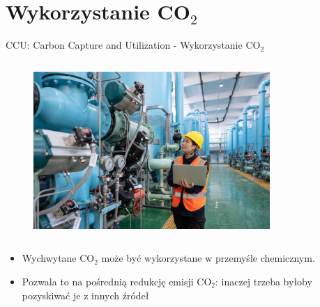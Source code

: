 \section{Wykorzystanie CO$_2$}

\begin{columnframe}{CCU: Carbon Capture and Utilization - Wykorzystanie CO$_2$}
    \begin{column}{0.5\textwidth}
        \begin{figure}
            \centering
            \includegraphics[width=0.8\textwidth, frame]{images/chemical_engineering_stock_image.jpg}
        \end{figure}
    \end{column}
    \begin{column}{0.5\textwidth}
        \begin{itemize}
            \item Wychwytane CO$_2$ może być wykorzystane w przemyśle chemicznym.
            \item Pozwala to na pośrednią redukcję emisji CO$_2$: inaczej trzeba byłoby pozyskiwać je z innych źródeł
        \end{itemize}
    \end{column}
\end{columnframe}

